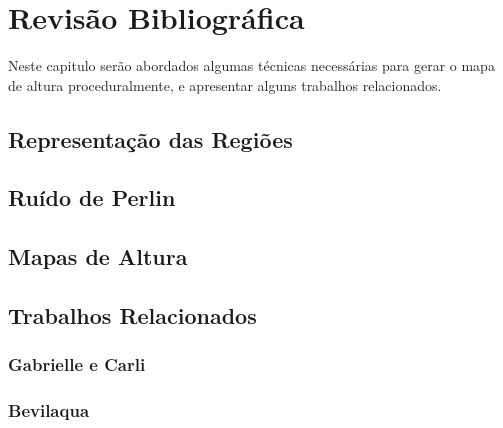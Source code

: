 \chapter{Revisão Bibliográfica}
Neste capitulo serão abordados algumas técnicas necessárias para gerar o mapa
de altura proceduralmente, e apresentar alguns trabalhos relacionados.

\section{Representação das Regiões}

\section{Ruído de Perlin}

\section{Mapas de Altura}

\section{Trabalhos Relacionados}

\subsection{Gabrielle e Carli}

\subsection{Bevilaqua}